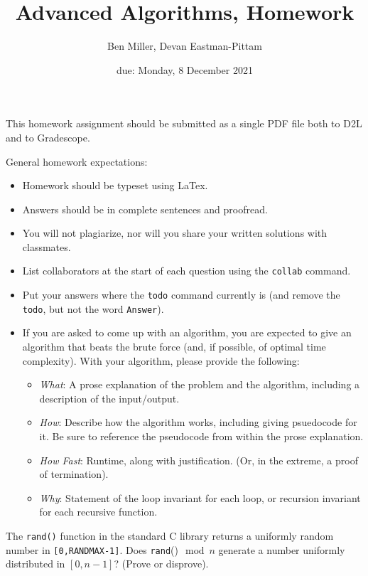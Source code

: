 \documentclass{article}
\title{Advanced Algorithms, Homework \hwnum}
\author{Ben Miller, Devan Eastman-Pittam}
\date{due: Monday, 8 December 2021}
\begin{document}
\maketitle

This homework assignment should be
submitted as a single PDF file both to D2L and to Gradescope.

General homework expectations:
\begin{itemize}
    \item Homework should be typeset using LaTex.
    \item Answers should be in complete sentences and proofread.
    \item You will not plagiarize, nor will you share your written solutions
        with classmates.
    \item List collaborators at the start of each question using the
        \texttt{collab} command.
    \item Put your answers where the \texttt{todo} command currently is (and
        remove the \texttt{todo}, but not the word \texttt{Answer}).
    \item If you are asked to come up with an algorithm, you are
        expected to give an algorithm that beats the brute force (and, if possible, of
        optimal time complexity). With your algorithm, please provide the following:
        \begin{itemize}
            \item \emph{What}: A prose explanation of the problem and the algorithm,
                including a description of the input/output.
            \item \emph{How}: Describe how the algorithm works, including giving
                psuedocode for it.  Be sure to reference the pseudocode
                from within the prose explanation.
            \item \emph{How Fast}: Runtime, along with justification.  (Or, in the
                extreme, a proof of termination).
            \item \emph{Why}: Statement of the loop invariant for each loop, or
                recursion invariant for each recursive function.
        \end{itemize}
\end{itemize}


\collab{}
\nextprob{}

The \texttt{rand()} function in the standard C library returns a
uniformly random number in \texttt{[0,RANDMAX-1]}. Does \texttt{rand}()$\mod n$
generate a number uniformly distributed in $[0,n-1]$? (Prove or disprove).
\end{document}
